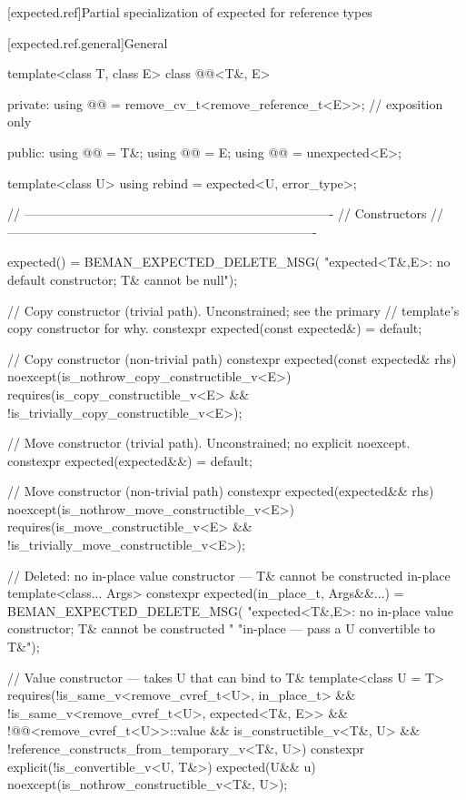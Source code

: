 [expected.ref]{Partial specialization of expected for reference types}

[expected.ref.general]{General}

\begin{codeblock}
template<class T, class E>
class @@<T&, E> {
private:
  using @@ = remove_cv_t<remove_reference_t<E>>; // exposition only

public:
  using @@ = T&;
  using @@ = E;
  using @@ = unexpected<E>;

  template<class U> using rebind = expected<U, error_type>;

  // -------------------------------------------------------------------------
  // Constructors
  // -------------------------------------------------------------------------

  expected() = BEMAN_EXPECTED_DELETE_MSG(
      "expected<T&,E>: no default constructor; T& cannot be null");

  // Copy constructor (trivial path). Unconstrained; see the primary
  // template's copy constructor for why.
  constexpr expected(const expected&) = default;

  // Copy constructor (non-trivial path)
  constexpr expected(const expected& rhs) noexcept(is_nothrow_copy_constructible_v<E>)
    requires(is_copy_constructible_v<E> && !is_trivially_copy_constructible_v<E>);

  // Move constructor (trivial path). Unconstrained; no explicit noexcept.
  constexpr expected(expected&&) = default;

  // Move constructor (non-trivial path)
  constexpr expected(expected&& rhs) noexcept(is_nothrow_move_constructible_v<E>)
    requires(is_move_constructible_v<E> && !is_trivially_move_constructible_v<E>);

  // Deleted: no in-place value constructor — T& cannot be constructed in-place
  template<class... Args>
  constexpr expected(in_place_t, Args&&...) = BEMAN_EXPECTED_DELETE_MSG(
      "expected<T&,E>: no in-place value constructor; T& cannot be constructed "
      "in-place — pass a U convertible to T&");

  // Value constructor — takes U that can bind to T&
  template<class U = T>
    requires(!is_same_v<remove_cvref_t<U>, in_place_t> &&
             !is_same_v<remove_cvref_t<U>, expected<T&, E>> &&
             !@@<remove_cvref_t<U>>::value &&
             is_constructible_v<T&, U> && !reference_constructs_from_temporary_v<T&, U>)
  constexpr explicit(!is_convertible_v<U, T&>)
      expected(U&& u) noexcept(is_nothrow_constructible_v<T&, U>);

}
\end{codeblock}
